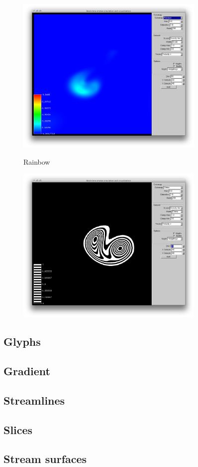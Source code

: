 \begin{figure}[htbp]
\centering
\begin{minipage}[t]{0.48\textwidth}
        \includegraphics[height=3in]{figures/colormaps/rainbowSmokeScaled.png}
\caption{Rainbow}
\label{fig:revised:modelingLanguages}
\end{minipage}\hspace{.04\textwidth}%
\begin{minipage}[t]{0.48\textwidth}
        \includegraphics[height=3in]{figures/colormaps/zebraSmoke.png}
    \caption{}
    \label{fig:revised:reqFormat}
\end{minipage}
\end{figure}


\subsection{Glyphs}
\subsection{Gradient}
\subsection{Streamlines}
\subsection{Slices}
\subsection{Stream surfaces}